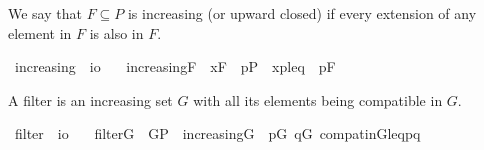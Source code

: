 We say that $F\subseteq P$ is increasing (or upward closed) if every
extension of any element in $F$ is also in $F$.
\begin{isabelle}
\isamarkupfalse%
\ increasing\ {\isacharcolon}{\isacharcolon}\ {\isachardoublequoteopen}i{\isasymRightarrow}o{\isachardoublequoteclose}\ \isanewline
\ \ {\isachardoublequoteopen}increasing{\isacharparenleft}F{\isacharparenright}\ {\isacharequal}{\isacharequal}\ {\isasymforall}x{\isasymin}F{\isachardot}\ {\isasymforall}\ p{\isasymin}P\ {\isachardot}\ {\isasymlangle}x{\isacharcomma}p{\isasymrangle}{\isasymin}leq\ {\isasymlongrightarrow}\ p{\isasymin}F{\isachardoublequoteclose}
\end{isabelle}
A filter is an increasing set $G$ with all its elements being compatible in $G$.
\begin{isabelle}
\isamarkupfalse%
\ filter\ {\isacharcolon}{\isacharcolon}\ {\isachardoublequoteopen}i{\isasymRightarrow}o{\isachardoublequoteclose}\ \isanewline
\ \ {\isachardoublequoteopen}filter{\isacharparenleft}G{\isacharparenright}\ {\isacharequal}{\isacharequal}\ G{\isasymsubseteq}P\ {\isasymand}\ increasing{\isacharparenleft}G{\isacharparenright}\ {\isasymand}\ {\isacharparenleft}{\isasymforall}p{\isasymin}G{\isachardot}\ {\isasymforall}q{\isasymin}G{\isachardot}\ compat{\isacharunderscore}in{\isacharparenleft}G{\isacharcomma}leq{\isacharcomma}p{\isacharcomma}q{\isacharparenright}{\isacharparenright}{\isachardoublequoteclose}
\end{isabelle}

